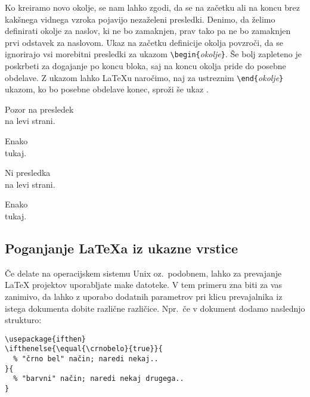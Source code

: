 Ko kreiramo novo okolje, se nam lahko zgodi, da se na začetku ali na koncu brez 
kakšnega vidnega vzroka pojavijo
nezaželeni presledki. Denimo, da želimo definirati okolje za naslov, 
ki ne bo zamaknjen, prav tako pa ne bo zamaknjen prvi odstavek za 
naslovom. Ukaz  na začetku definicije okolja povzroči,
da se ignorirajo vsi morebitni presledki za ukazom 
\verb|\begin{|\emph{okolje}\verb|}|. Še bolj
zapleteno je poskrbeti za dogajanje po koncu bloka, saj na koncu okolja pride
do posebne obdelave. Z ukazom 
 lahko \LaTeX{}u naročimo, naj za ustreznim
\verb|\end{|\emph{okolje}\verb|}| ukazom, ko bo posebne obdelave konec, sproži še ukaz 
.

\begin{example}
\newenvironment{enostavno}%
 {\noindent}%
 {\par\noindent}

\begin{enostavno}
Pozor na presledek\\na levi strani.
\end{enostavno}
Enako\\tukaj.
\end{example}

\begin{example}
\newenvironment{pravilno}%
 {\noindent\ignorespaces}%
 {\par\noindent%
   \ignorespacesafterend}

\begin{pravilno}
Ni presledka\\na levi strani.
\end{pravilno}
Enako\\tukaj.
\end{example}

\subsection{Poganjanje \LaTeX{a} iz ukazne vrstice}

Če delate na operacijskem sistemu Unix oz.~podobnem, lahko za prevajanje
\LaTeX{} projektov uporabljate make datoteke. V tem primeru zna biti za
vas zanimivo, da lahko z uporabo dodatnih parametrov pri klicu prevajalnika
iz istega dokumenta dobite različne različice. Npr.~če v dokument dodamo
naslednjo strukturo:

\begin{verbatim}
\usepackage{ifthen}
\ifthenelse{\equal{\crnobelo}{true}}{
  % "črno bel" način; naredi nekaj..
}{
  % "barvni" način; naredi nekaj drugega..
}
\end{verbatim}

